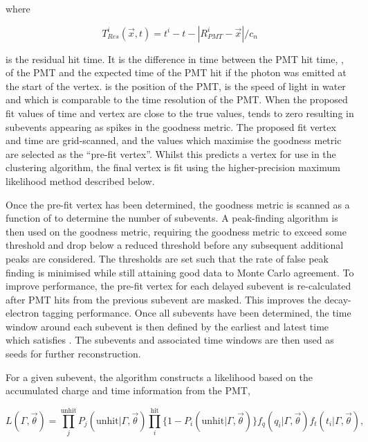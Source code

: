 where

\begin{equation}
  T_{Res}^{i}(\vec{x},t) = t^{i} - t - \left| R^{i}_{PMT} - \vec{x} \right|/c_{n}
\end{equation}

is the residual hit time. It is the difference in time between the PMT hit time, , of the  PMT and the expected time of the PMT hit if the photon was emitted at the start of the vertex.  is the position of the  PMT,  is the speed of light in water and  which is comparable to the time resolution of the PMT. When the proposed fit values of time and vertex are close to the true values,  tends to zero resulting in subevents appearing as spikes in the goodness metric. The proposed fit vertex and time are grid-scanned, and the values which maximise the goodness metric are selected as the ``pre-fit vertex''. Whilst this predicts a vertex for use in the clustering algorithm, the final vertex is fit using the higher-precision maximum likelihood method described below.

Once the pre-fit vertex has been determined, the goodness metric is scanned as a function of  to determine the number of subevents. A peak-finding algorithm is then used on the goodness metric, requiring the goodness metric to exceed some threshold and drop below a reduced threshold before any subsequent additional peaks are considered. The thresholds are set such that the rate of false peak finding is minimised while still attaining good data to Monte Carlo agreement. To improve performance, the pre-fit vertex for each delayed subevent is re-calculated after PMT hits from the previous subevent are masked. This improves the decay-electron tagging performance. Once all subevents have been determined, the time window around each subevent is then defined by the earliest and latest time which satisfies . The subevents and associated time windows are then used as seeds for further reconstruction.

For a given subevent, the \fq algorithm constructs a likelihood based on the accumulated charge  and time information  from the  PMT,

\begin{equation}
  L(\Gamma, \vec{\theta}) = \prod^{\text{unhit}}_{j} P_{j}(\text{unhit}|\Gamma,\vec{\theta}) \prod^{\text{hit}}_{i} \{ 1 - P_{i}(\text{unhit}|\Gamma,\vec{\theta}) \}   f_{q}(q_{i} | \Gamma, \vec{\theta}) f_{t}(t_{i} | \Gamma, \vec{\theta}),
\end{equation}

